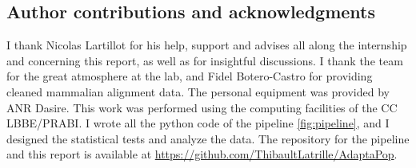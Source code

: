 \documentclass[10pt]{article}
\begin{document}
\begin{multicols}{2}
	\section*{Author contributions and acknowledgments}
	I thank Nicolas Lartillot for his help, support and advises all along the internship and concerning this report, as well as for insightful discussions. I thank the team for the great atmosphere at the lab, and Fidel Botero-Castro for providing cleaned mammalian alignment data. The personal equipment was provided by ANR Dasire. This work was performed using the computing  facilities of the CC LBBE/PRABI. I wrote all the python code of the pipeline \ref{fig:pipeline}, and I designed the statistical tests and analyze the data. The repository for the pipeline and this report is available at \href{https://github.com/ThibaultLatrille/AdaptaPop}{https://github.com/ThibaultLatrille/AdaptaPop}.

	
	
	
	\end{multicols}
\end{document}
